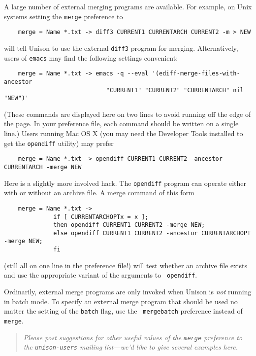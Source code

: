 \documentclass{article}
\begin{document}
A large number of external merging programs are available.  
For example, on Unix systems setting the \verb|merge| preference to
\begin{verbatim}
    merge = Name *.txt -> diff3 CURRENT1 CURRENTARCH CURRENT2 -m > NEW
\end{verbatim}
\noindent
will tell Unison to use the external \verb|diff3| program for merging.  
%
Alternatively, users of \verb|emacs| may find the following settings convenient:
\begin{verbatim}
    merge = Name *.txt -> emacs -q --eval '(ediff-merge-files-with-ancestor 
                             "CURRENT1" "CURRENT2" "CURRENTARCH" nil "NEW")' 
\end{verbatim}
\noindent
(These commands are displayed here on two lines to avoid running off the
edge of the page.  In your preference file, each command should be written on a
single line.) 
Users running Mac OS X (you may need the Developer Tools installed to get
the {\tt opendiff} utility) may prefer
\begin{verbatim}
    merge = Name *.txt -> opendiff CURRENT1 CURRENT2 -ancestor CURRENTARCH -merge NEW
\end{verbatim}
Here is a slightly more involved hack.  The {\tt opendiff} program can
operate either with or without an archive file.  A merge command of this
form 
\begin{verbatim}
    merge = Name *.txt -> 
              if [ CURRENTARCHOPTx = x ]; 
              then opendiff CURRENT1 CURRENT2 -merge NEW; 
              else opendiff CURRENT1 CURRENT2 -ancestor CURRENTARCHOPT -merge NEW; 
              fi
\end{verbatim}
(still all on one line in the preference file!) will test whether an archive
file exists and use the appropriate variant of the arguments to {\tt
  opendiff}. 

Ordinarily, external merge programs are only invoked when Unison is {\em
  not} running in batch mode.  To specify an external merge program that
should be used no matter the setting of the {\tt batch} flag, use the {\tt
  mergebatch} preference instead of {\tt merge}.

\begin{quote}
\it
Please post suggestions for other useful values of the
\verb|merge| preference to the {\tt unison-users} mailing list---we'd like
to give several examples here.
\end{quote}

\end{document}
